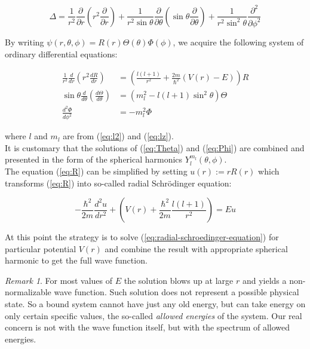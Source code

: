 \documentclass[11pt, a4paper, german]{article}
\theoremstyle{plain}
\theoremstyle{definition}
\theoremstyle{remark}
\newtheorem{remark}[theorem]{Remark}
\numberwithin{equation}{section}
\numberwithin{theorem}{section}
\begin{document}
$$ \Delta = \frac{1}{r^2} \frac{\partial}{\partial r}\left(r^2 \frac{\partial}{\partial r}\right) + \frac{1}{r^2 \sin \theta} \frac{\partial}{\partial \theta} \left( \sin \theta \frac{\partial}{\partial \theta}\right) + \frac{1}{r^2 \sin^2 \theta}\frac{\partial ^2}{\partial \phi ^2}$$

By writing $\psi(r, \theta, \phi) = R(r)\Theta(\theta)\Phi(\phi)$, we acquire the following system of ordinary differential equations:

\begin{align} 
\frac{1}{r^2}\frac{d}{dr}\left(r^2 \frac{dR}{dr}\right) &= \left(\frac{l(l+1)}{r^2} + \frac{2m}{\hbar^2}(V(r)-E)\right) R \label{eq:R}\\
\sin \theta \frac{d}{d\theta}\left( \frac{d\Theta}{d \theta}\right) &= \left( m_l^2 - l(l+1)\sin^2\theta\right)\Theta \label{eq:Theta} \\
\frac{d^2\Phi}{d\phi^2} &= -m_l^2\Phi \label{eq:Phi}
\end{align}

where $l$ and $m_l$ are from (\ref{eq:l2}) and (\ref{eq:lz}).\\

It is customary that the solutions of (\ref{eq:Theta}) and (\ref{eq:Phi}) are combined and presented in the form of the spherical harmonics $Y^{m_l}_l(\theta, \phi)$. \\

The equation (\ref{eq:R}) can be simplified by setting $u(r) := r R(r)$ which transforms (\ref{eq:R}) into so-called radial Schrödinger equation:

\begin{equation} \label{eq:radial-schroedinger-equation}
-\frac{\hbar^2}{2m}\frac{d^2u}{dr^2}+\left(V(r)+\frac{\hbar^2}{2m}\frac{l(l+1)}{r^2}\right) = Eu
\end{equation}

At this point the strategy is to solve (\ref{eq:radial-schroedinger-equation}) for particular potential $V(r)$ and combine the result with appropriate spherical harmonic to get the full wave function.

\begin{remark}
For most values of $E$ the solution blows up at large $r$ and yields a non-normalizable wave function. Such solution does not represent a possible physical state. So a bound system cannot have just any old energy, but can take energy on only certain specific values, the so-called \textit{allowed energies} of the system. Our real concern is not with the wave function itself, but with the spectrum of allowed energies.
\end{remark}
\end{document}
